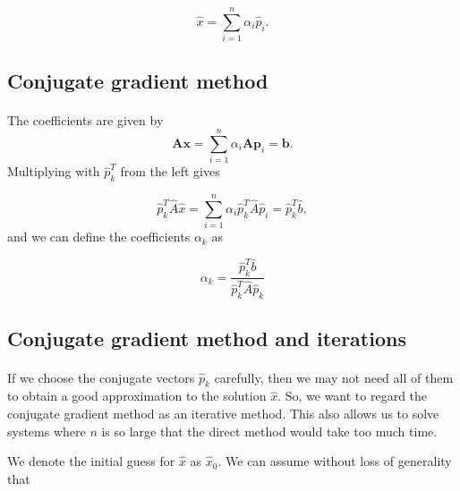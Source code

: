 \documentclass[%
twoside,                 %
final,                   %
10pt]{article}
\begin{document}
\begin{equation*}
  \hat{x}  = \sum^{n}_{i=1} \alpha_i \hat{p}_i.
\end{equation*}



\subsection*{Conjugate gradient method}

\paragraph{}
The coefficients are given by
\begin{equation*}
    \mathbf{A}\mathbf{x} = \sum^{n}_{i=1} \alpha_i \mathbf{A} \mathbf{p}_i = \mathbf{b}.
\end{equation*}
Multiplying with $\hat{p}_k^T$  from the left gives

\begin{equation*}
  \hat{p}_k^T \hat{A}\hat{x} = \sum^{n}_{i=1} \alpha_i\hat{p}_k^T \hat{A}\hat{p}_i= \hat{p}_k^T \hat{b},
\end{equation*}
and we can define the coefficients $\alpha_k$ as

\begin{equation*}
    \alpha_k = \frac{\hat{p}_k^T \hat{b}}{\hat{p}_k^T \hat{A} \hat{p}_k}
\end{equation*}



\subsection*{Conjugate gradient method and iterations}

\paragraph{}

If we choose the conjugate vectors $\hat{p}_k$ carefully, 
then we may not need all of them to obtain a good approximation to the solution 
$\hat{x}$. 
So, we want to regard the conjugate gradient method as an iterative method. 
This also allows us to solve systems where $n$ is so large that the direct 
method would take too much time.

We denote the initial guess for $\hat{x}$ as $\hat{x}_0$. 
We can assume without loss of generality that
\end{document}

